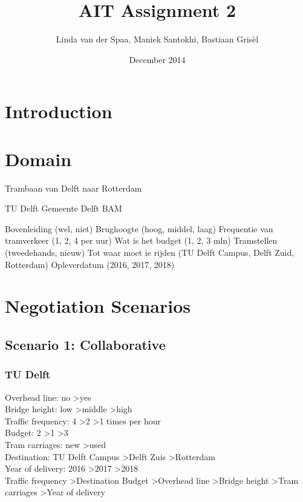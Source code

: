 \documentclass{article}
\title{AIT Assignment 2}
\author{Linda van der Spaa, Maniek Santokhi, Bastiaan Gris\`el}
\date{December 2014}
\begin{document}
\maketitle

\section{Introduction}

\section{Domain}
Trambaan van Delft naar Rotterdam

TU Delft
Gemeente Delft
BAM

Bovenleiding (wel, niet)
Brughoogte (hoog, middel, laag)
Frequentie van tramverkeer (1, 2, 4 per uur)
Wat is het budget (1, 2, 3 mln)
Tramstellen (tweedehands, nieuw)
Tot waar moet ie rijden (TU Delft Campus, Delft Zuid, Rotterdam)
Opleverdatum (2016, 2017, 2018)

\section{Negotiation Scenarios}

\subsection{Scenario 1: Collaborative}

\subsubsection{TU Delft}
Overhead line: no \textgreater yes \\
Bridge height: low \textgreater middle \textgreater high \\
Traffic frequency: 4 \textgreater 2 \textgreater 1 times per hour \\
Budget: 2 \textgreater 1 \textgreater 3 \\
Tram carriages: new \textgreater used \\
Destination: TU Delft Campus \textgreater Delft Zuis \textgreater Rotterdam \\
Year of delivery: 2016 \textgreater 2017 \textgreater 2018 \\

Traffic frequency \textgreater Destination Budget \textgreater Overhead line \textgreater Bridge height \textgreater Tram carriages \textgreater Year of delivery
\end{document}
